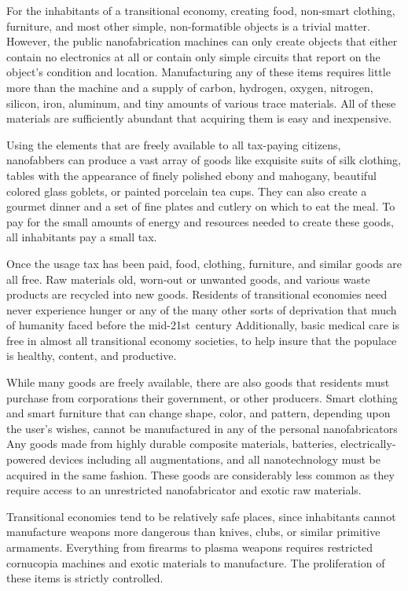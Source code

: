 For the inhabitants of a transitional economy, creating
food, non-smart clothing, furniture, and most
other simple, non-formatible objects is a trivial matter. 
However, the public nanofabrication machines can 
only create objects that either contain no electronics 
at all or contain only simple circuits that report on the 
object's condition and location. Manufacturing any 
of these items requires little more than the machine 
and a supply of carbon, hydrogen, oxygen, nitrogen, 
silicon, iron, aluminum, and tiny amounts of various 
trace materials. All of these materials are sufficiently 
abundant that acquiring them is easy and inexpensive.

Using the elements that are freely available to all 
tax-paying citizens, nanofabbers can produce a vast 
array of goods like exquisite suits of silk clothing, 
tables with the appearance of finely polished ebony 
and mahogany, beautiful colored glass goblets, or 
painted porcelain tea cups. They can also create a 
gourmet dinner and a set of fine plates and cutlery on 
which to eat the meal. To pay for the small amounts 
of energy and resources needed to create these goods, 
all inhabitants pay a small tax.

Once the usage tax has been paid, food, clothing, 
furniture, and similar goods are all free. Raw materials
old, worn-out or unwanted goods, and various
waste products are recycled into new goods. Residents 
of transitional economies need never experience 
hunger or any of the many other sorts of deprivation 
that much of humanity faced before the mid-21st century
Additionally, basic medical care is free in almost
all transitional economy societies, to help insure that 
the populace is healthy, content, and productive.

While many goods are freely available, there are 
also goods that residents must purchase from corporations
their government, or other producers. Smart
clothing and smart furniture that can change shape, 
color, and pattern, depending upon the user's wishes, 
cannot be manufactured in any of the personal nanofabricators
Any goods made from highly durable
composite materials, batteries, electrically-powered 
devices including all augmentations, and all nanotechnology
must be acquired in the same fashion. These
goods are considerably less common as they require 
access to an unrestricted nanofabricator and exotic 
raw materials.

Transitional economies tend to be relatively safe 
places, since inhabitants cannot manufacture weapons 
more dangerous than knives, clubs, or similar primitive
armaments. Everything from firearms to plasma
weapons requires restricted cornucopia machines and 
exotic materials to manufacture. The proliferation of 
these items is strictly controlled.

